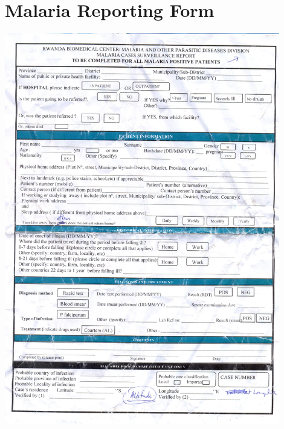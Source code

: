 \appendix
%
\chapter{Malaria Reporting Form}
\label{chap:malaria_reporting_form}
\includegraphics[width=12cm]{appendix/pdf/malaria_reporting_2}

